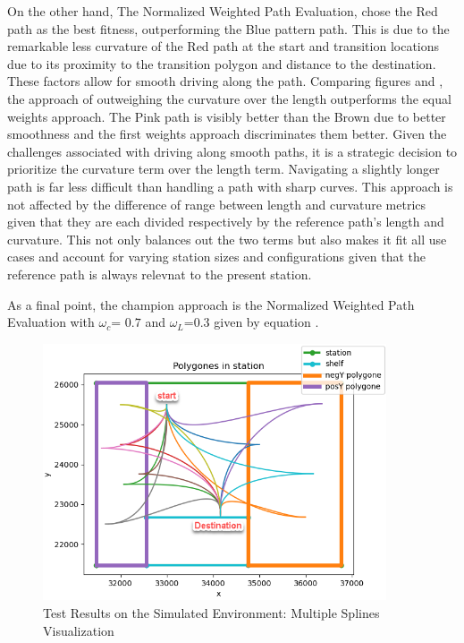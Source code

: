 \noindent On the other hand, The Normalized Weighted Path Evaluation, chose the Red path as the best fitness, 
outperforming the Blue pattern path. This is due to the remarkable less curvature of the Red path at the start 
and transition locations due to its proximity to the transition polygon and distance to the destination.
These factors allow for smooth driving along the path.
Comparing figures  and , the approach of outweighing the curvature 
over the length outperforms the equal weights approach. The Pink path is visibly better than the Brown due 
to better smoothness and the first weights approach discriminates them better. 
Given the challenges associated with driving along smooth paths, it is a strategic decision to prioritize the 
curvature term over the length term. Navigating a slightly longer path is far less difficult than handling a path 
with sharp curves.
This approach is not affected by the difference of range between length and curvature metrics given that 
they are each divided respectively by the reference path's length and curvature. This not only balances out the 
two terms but also makes it fit all use cases and account for varying station sizes and configurations given that 
the reference path is always relevnat to the present station.

As a final point, the champion approach is the Normalized Weighted Path Evaluation with \(\omega_c\)= \(0.7\) 
and \(\omega_L\)=\(0.3\) given by equation .



\begin{figure}[H]
    \begin{center}
        \includegraphics[width=4in]{images/Chap2/Mult_Splines_noted.png} %
        \caption{Test Results on the Simulated Environment: Multiple Splines Visualization}
        \label{Mult_splines}
        \end{center}    
\end{figure}

